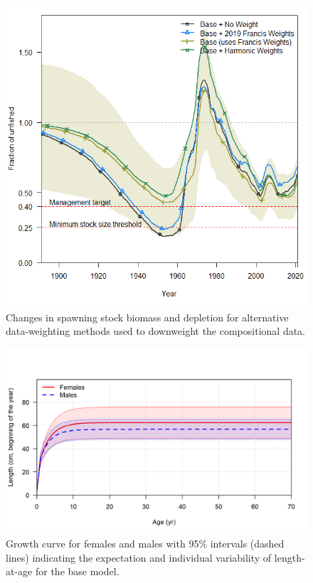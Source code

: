 \documentclass[11pt,
  english,
  a4paper,
]{article}
\begin{document}
\begin{figure}
\centering
\includegraphics[width=1\textwidth,height=1\textheight]{figs/harmonicandfrancis.png}
\caption{Changes in spawning stock biomass and depletion for alternative data-weighting methods used to downweight the compositional data. \label{fig:harmonicandfrancis}}
\end{figure}

\tagmcend\tagstructend


\begin{figure}
\centering
\includegraphics[width=1\textwidth,height=1\textheight]{figs/bio1_sizeatage.png}
\caption{Growth curve for females and males with 95\% intervals (dashed lines) indicating the expectation and individual variability of length-at-age for the base model.\label{fig:bio_53}}
\end{figure}
\end{document}
